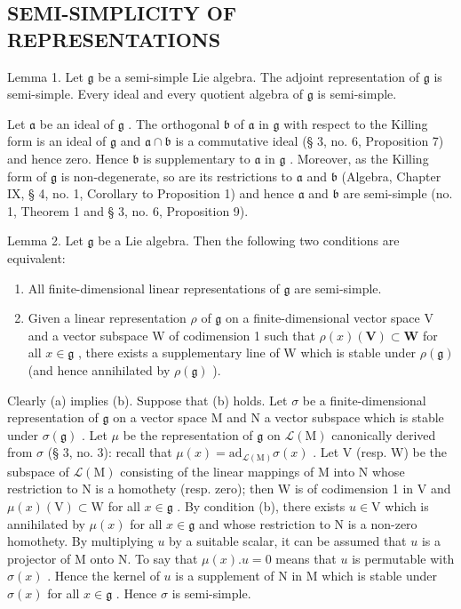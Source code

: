 \subsection{SEMI-SIMPLICITY OF REPRESENTATIONS}

Lemma 1. Let \(\mathfrak{g}\) be a semi-simple Lie algebra. The adjoint representation of \(\mathfrak{g}\) is semi-simple. Every ideal and every quotient algebra of \(\mathfrak{g}\) is semi-simple.

Let \(\mathfrak{a}\) be an ideal of \(\mathfrak{g}\) . The orthogonal \(\mathfrak{b}\) of \(\mathfrak{a}\) in \(\mathfrak{g}\) with respect to the Killing form is an ideal of \(\mathfrak{g}\) and \(\mathfrak{a} \cap \mathfrak{b}\) is a commutative ideal (§ 3, no. 6, Proposition 7) and hence zero. Hence \(\mathfrak{b}\) is supplementary to \(\mathfrak{a}\) in \(\mathfrak{g}\) . Moreover, as the Killing form of \(\mathfrak{g}\) is non-degenerate, so are its restrictions to \(\mathfrak{a}\) and \(\mathfrak{b}\) (Algebra, Chapter IX, § 4, no. 1, Corollary to Proposition 1) and hence \(\mathfrak{a}\) and \(\mathfrak{b}\) are semi-simple (no. 1, Theorem 1 and § 3, no. 6, Proposition 9).

Lemma 2. Let \(\mathfrak{g}\) be a Lie algebra. Then the following two conditions are equivalent:

\begin{enumerate}
\def\labelenumi{(\alph{enumi})}
\item
  All finite-dimensional linear representations of \(\mathfrak{g}\) are semi-simple.
\item
  Given a linear representation \(\rho\) of \(\mathfrak{g}\) on a finite-dimensional vector space V and a vector subspace W of codimension 1 such that \(\rho(x)(\mathbf{V}) \subset \mathbf{W}\) for all \(x \in \mathfrak{g}\) , there exists a supplementary line of W which is stable under \(\rho(\mathfrak{g})\) (and hence annihilated by \(\rho(\mathfrak{g})\) ).
\end{enumerate}

Clearly (a) implies (b). Suppose that (b) holds. Let \(\sigma\) be a finite-dimensional representation of \(\mathfrak{g}\) on a vector space M and N a vector subspace which is stable under \(\sigma(\mathfrak{g})\) . Let \(\mu\) be the representation of \(\mathfrak{g}\) on \(\mathcal{L}(\mathrm{M})\) canonically derived from \(\sigma\) (§ 3, no. 3): recall that \(\mu(x) = \mathrm{ad}_{\mathcal{L}(\mathrm{M})}\sigma(x)\) . Let V (resp. W) be the subspace of \(\mathcal{L}(\mathrm{M})\) consisting of the linear mappings of M into N whose restriction to N is a homothety (resp. zero); then W is of codimension 1 in V and \(\mu(x)(\mathrm{V})\subset\mathrm{W}\) for all \(x\in\mathfrak{g}\) . By condition (b), there exists \(u\in\mathrm{V}\) which is annihilated by \(\mu(x)\) for all \(x\in\mathfrak{g}\) and whose restriction to N is a non-zero homothety. By multiplying \(u\) by a suitable scalar, it can be assumed that \(u\) is a projector of M onto N. To say that \(\mu(x).u=0\) means that \(u\) is permutable with \(\sigma(x)\) . Hence the kernel of \(u\) is a supplement of N in M which is stable under \(\sigma(x)\) for all \(x\in\mathfrak{g}\) . Hence \(\sigma\) is semi-simple.

